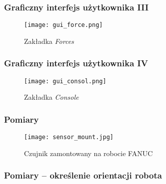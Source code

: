 \documentclass[aspectratio=169]{beamer}  %
\begin{document}
\begin{frame}
	\frametitle{Graficzny interfejs użytkownika III}
	\begin{figure}
		\centering
		\texttt{[image: gui\_force.png]}
		\caption{Zakładka \textit{Forces}}
	\end{figure}
\end{frame}

\begin{frame}
	\frametitle{Graficzny interfejs użytkownika IV}
	\begin{figure}
		\centering
		\texttt{[image: gui\_consol.png]}
		\caption{Zakładka \textit{Console}}
	\end{figure}
\end{frame}

\begin{frame}
	\frametitle{Pomiary}
	\begin{figure}
		\centering
		\texttt{[image: sensor\_mount.jpg]}
		\caption{Czujnik  zamontowany  na robocie  FANUC}
	\end{figure}
\end{frame}

\begin{frame}
	\frametitle{Pomiary -- określenie orientacji robota \href{run:movies/attitude_test.mp4}{}}
	\begin{columns}
		\begin{column}{0.5\textwidth}
			
			\begin{figure}
				\centering
			\end{figure}
		\end{column}
		\begin{column}{0.5\textwidth}
			\begin{figure}
				\centering
			\end{figure}
		\end{column}
	\end{columns}
\end{frame}
\end{document}
